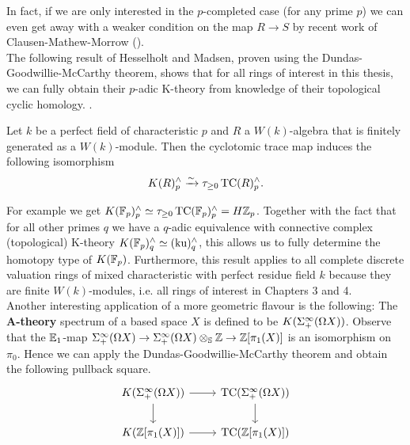 In fact, if we are only interested in the $p$-completed case (for any prime $p$) we can even get away with a weaker condition on the map $R\to S$ by recent work of Clausen-Mathew-Morrow (\cite[Theorem~A]{CMMHenselian}).\\
The following result of Hesselholt and Madsen, proven using the Dundas-Goodwillie-McCarthy theorem, shows that for all rings of interest in this thesis, we can fully obtain their $p$-adic K-theory from knowledge of their topological cyclic homology.  
. 
\begin{thm}\cite[Theorem~D]{HMWV}
    Let $k$ be a perfect field of characteristic $p$ and $R$ a $W(k)$-algebra that is finitely generated as a $W(k)$-module. Then the cyclotomic trace map induces the following isomorphism
    \begin{align*}
        K(R)_p^{\wedge}\xrightarrow{\sim} \tau_{\geq 0}\operatorname{TC}(R)_p^{\wedge}.
    \end{align*}
\end{thm}
For example we get $K(\mathbb{F}_p)_p^{\wedge}\simeq \tau_{\geq 0}\operatorname{TC}(\mathbb{F}_p)_p^{\wedge}=H\mathbb{Z}_p$. Together with the fact that for all other primes $q$ we have a $q$-adic equivalence with connective complex (topological) K-theory $K(\mathbb{F}_p)_q^{\wedge}\simeq (\mathrm{ku})_q^{\wedge}$, this allows us to fully determine the homotopy type of $K(\mathbb{F}_p)$. 
Furthermore, this result applies to all complete discrete valuation rings of mixed characteristic with perfect residue field $k$ because they are finite $W(k)$-modules, i.e. all rings of interest in Chapters 3 and 4. \\
Another interesting application of a more geometric flavour is the following: The \textbf{A-theory} spectrum of a based space $X$ is defined to be $K(\Sigma^{\infty}_{+}(\Omega X))$. Observe that the $\mathbb{E}_1$-map $\Sigma^{\infty}_{+}(\Omega X)\rightarrow \Sigma^{\infty}_{+}(\Omega X)\otimes_{\mathbb{S}}\mathbb{Z}\rightarrow \mathbb{Z}[\pi_1(X)]$ is an isomorphism on $\pi_0$. Hence we can apply the Dundas-Goodwillie-McCarthy theorem and obtain the following pullback square.
\[\begin{tikzcd}
	{K(\Sigma^\infty_+(\Omega X))} & {\mathrm{TC}(\Sigma^\infty_+(\Omega X))} \\
	{K(\mathbb{Z}[\pi_1(X)])} & {\mathrm{TC}(\mathbb{Z}[\pi_1(X)])}
	\arrow[from=1-1, to=1-2]
	\arrow[from=1-2, to=2-2]
	\arrow[from=1-1, to=2-1]
	\arrow[from=2-1, to=2-2]
\end{tikzcd}\]
